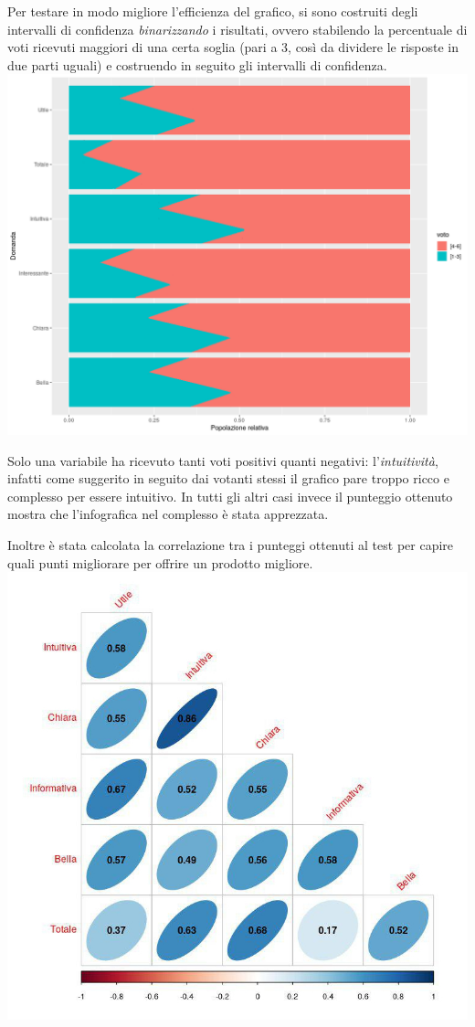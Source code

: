 \documentclass[12pt, a4paper, twocolumn]{article} %
\begin{document}
Per testare in modo migliore l'efficienza del grafico, si sono costruiti degli intervalli di confidenza \textit{binarizzando} i risultati, ovvero stabilendo la percentuale di voti ricevuti maggiori di una certa soglia (pari a 3, così da dividere le risposte in due parti uguali) e costruendo in seguito gli intervalli di confidenza.
\includegraphics[width=\linewidth]{barplot.png}

Solo una variabile ha ricevuto tanti voti positivi quanti negativi: l'\textit{intuitività}, infatti come suggerito in seguito dai votanti stessi il grafico pare troppo ricco e complesso per essere intuitivo.
In tutti gli altri casi invece il punteggio ottenuto mostra che l'infografica nel complesso è stata apprezzata.

Inoltre è stata calcolata la correlazione tra i punteggi ottenuti al test per capire quali punti migliorare per offrire un prodotto migliore.
\includegraphics[width=\linewidth]{correlogramma.jpg}
\end{document}
